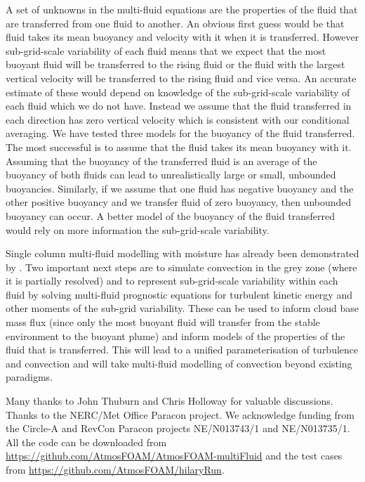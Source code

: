 \documentclass[draft]{agujournal2019}
\begin{document}
A set of unknowns in the multi-fluid equations are the properties
of the fluid that are transferred from one fluid to another. An obvious
first guess would be that fluid takes its mean buoyancy and velocity
with it when it is transferred. However sub-grid-scale variability
of each fluid means that we expect that the most buoyant fluid will
be transferred to the rising fluid or the fluid with the largest vertical
velocity will be transferred to the rising fluid and vice versa. An
accurate estimate of these would depend on knowledge of the sub-grid-scale
variability of each fluid which we do not have. Instead we assume
that the fluid transferred in each direction has zero vertical velocity
which is consistent with our conditional averaging. We have tested
three models for the buoyancy of the fluid transferred. The most successful
is to assume that the fluid takes its mean buoyancy with it. Assuming
that the buoyancy of the transferred fluid is an average of the buoyancy
of both fluids can lead to unrealistically large or small, unbounded
buoyancies. Similarly, if we assume that one fluid has negative buoyancy
and the other positive buoyancy and we transfer fluid of zero buoyancy,
then unbounded buoyancy can occur. A better model of the buoyancy
of the fluid transferred would rely on more information the sub-grid-scale
variability.

Single column multi-fluid modelling with moisture has already been
demonstrated by . Two important next steps are to simulate
convection in the grey zone (where it is partially resolved) and to
represent sub-grid-scale variability within each fluid by solving
multi-fluid prognostic equations for turbulent kinetic energy and
other moments of the sub-grid variability. These can be used to inform
cloud base mass flux (since only the most buoyant fluid will transfer
from the stable environment to the buoyant plume) and inform models
of the properties of the fluid that is transferred. This will lead
to a unified parameterisation of turbulence and convection and will
take multi-fluid modelling of convection beyond existing paradigms. 

\acknowledgments

Many thanks to John Thuburn and Chris Holloway for valuable discussions.
Thanks to the NERC/Met Office Paracon project. We acknowledge funding
from the Circle-A and RevCon Paracon projects NE/N013743/1 and NE/N013735/1. All the code can be downloaded from \url{https://github.com/AtmosFOAM/AtmosFOAM-multiFluid} and the test cases from \url{https://github.com/AtmosFOAM/hilaryRun}.


\end{document}
